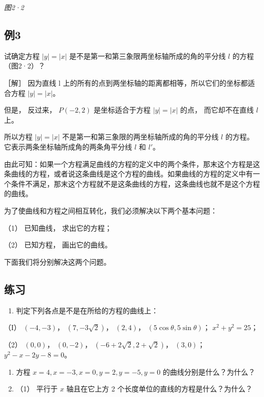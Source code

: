 \emph{图2·2}

\subsection{例3}\label{ux4f8b3-5}

试确定方程 \(|y| = |x|\) 是不是第一和第三象限两坐标轴所成的角的平分线
\(l\) 的方程（图2·2）？

［解］ 因为直线 l
上的所有的点到两坐标轴的距离都相等，所以它们的坐标都适合方程
\(\left|y\right|=\left|x\right|\)。

但是， 反过来， \(P(-2, 2)\) 是坐标适合于方程 \(|y| = |x|\) 的点，
而它却不在直线 \(l\) 上。

所以方程 \(|y| = |x|\) 不是第一和第三象限的两坐标轴所成的角的平分线
\(l\) 的方程。它表示两条坐标轴所成角的两条角平分线 \(l\) 和 \(l'\)。

由此可知：如果一个方程满足曲线的方程的定义中的两个条件，那末这个方程是这条曲线的方程，或者说这条曲线是这个方程的曲线。如果曲线的方程的定义中有一个条件不满足，那末这个方程就不是这条曲线的方程，这条曲线也就不是这个方程的曲线。

为了使曲线和方程之间相互转化，我们必须解决以下两个基本问题：

（1） 已知曲线， 求出它的方程；

（2） 已知方程， 画出它的曲线。

下面我们将分别解决这两个问题。

\subsection{练习}\label{ux7ec3ux4e60-1}

\begin{enumerate}
\def\labelenumi{\arabic{enumi}.}
\tightlist
\item
  判定下列各点是不是在所给的方程的曲线上：
\end{enumerate}

（I） \((-4, -3)\)， \((7, -3\sqrt{2})\)， \((2, 4)\)，
\((5\cos \theta, 5\sin \theta)\)； \(x^{2} + y^{2} = 25\)；

（2） \((0, 0)\)， \((0, -2)\)， \((-6 + 2\sqrt{2}, 2 + \sqrt{2})\)，
\((3, 0)\)； \(y^{2} - x - 2y - 8 = 0\)。

\begin{enumerate}
\def\labelenumi{\arabic{enumi}.}
\setcounter{enumi}{1}
\item
  方程 \(x = 4, x = -3, x = 0, y = 2, y = -5, y = 0\)
  的曲线分别是什么？为什么？
\item
  （1） 平行于 \(x\) 轴且在它上方 2
  个长度单位的直线的方程是什么？为什么？
\end{enumerate}

